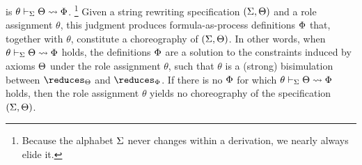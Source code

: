  is $\theta \vdash _{\Sigma} \Theta \rightsquigarrow \Phi$.%
\footnote{Because the alphabet $\Sigma$ never changes within a derivation, we nearly always elide it.}
Given a string rewriting specification $(\Sigma, \Theta)$ and a role assignment $\theta$, this judgment produces formula-as-process definitions $\Phi$ that, together with $\theta$, constitute a choreography of $(\Sigma, \Theta)$.
%
In other words, when $\theta \vdash _{\Sigma} \Theta \rightsquigarrow \Phi$ holds, the definitions $\Phi$ are a solution to the constraints induced by axioms $\Theta$ under the role assignment $\theta$, such that $\theta$ is a (strong) bisimulation between $\reduces_{\srsig}$ and $\reduces_{\orsig}$.%
%
If there is no $\Phi$ for which $\theta \vdash _{\Sigma} \Theta \rightsquigarrow \Phi$ holds, then the role assignment $\theta$ yields no choreography of the specification $(\Sigma, \Theta)$.


